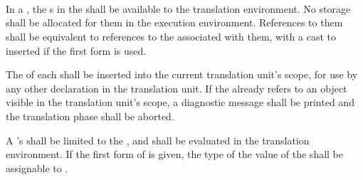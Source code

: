 \begin{grammar}
 \\
	  \\

 \\
	 \optional{\terminal{,}} \\
	 \terminal{,}  \\

 \\
	 \terminal{:}  \terminal{=}  \\
	 \terminal{=}  \\
\end{grammar}

\specsubsubitem
In a , the s in the
 shall be available to the translation
environment. No storage shall be allocated for them in the execution
environment. References to them shall be equivalent to references to the
 associated with them, with a cast to 
inserted if the first form is used.


\specsubsubitem
The  of each  shall be
inserted into the current translation unit's scope, for use by any other
declaration in the translation unit. If the  already
refers to an object visible in the translation unit's scope, a diagnostic
message shall be printed and the translation phase shall be aborted.

\specsubsubitem
A 's  shall be limited to
the , and shall be evaluated
in the translation environment. If the first form of
 is given, the type of the value of the
 shall be assignable to .


